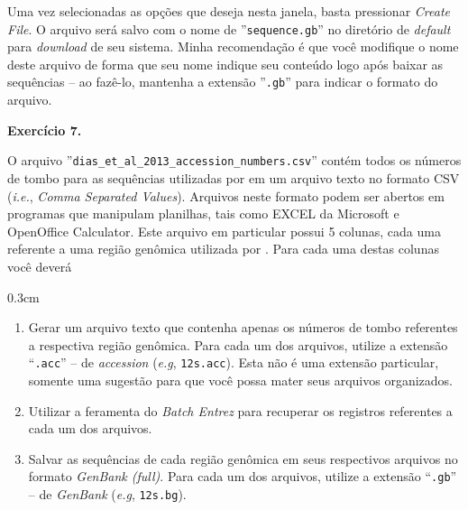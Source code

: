 \begin{refsection}

Uma vez selecionadas as opções que deseja nesta janela, basta pressionar \textit{Create File}. O arquivo será salvo com o nome de ''\texttt{sequence.gb}'' no diretório de \textit{default} para \textit{download} de seu sistema. Minha recomendação é que você modifique o nome deste arquivo de forma que seu nome indique seu conteúdo logo após baixar as sequências -- ao fazê-lo, mantenha a extensão ''\texttt{.gb}'' para indicar o formato do arquivo.\\


\begin{blackBlock}{\textbf{Exercício 7.}}\label{tut7:ex:ex1}

O arquivo ''\texttt{dias\_et\_al\_2013\_accession\_numbers.csv}'' contém todos os números de tombo para as sequências utilizadas por \textcite{dias_et_al_2013} em um arquivo texto no formato CSV (\textit{i.e.}, \textit{Comma Separated Values}). Arquivos neste formato podem ser abertos em programas que manipulam planilhas, tais como EXCEL da Microsoft e OpenOffice Calculator. Este arquivo em particular possui 5 colunas, cada uma referente a uma região genômica utilizada por \textcite{dias_et_al_2013}. Para cada uma destas colunas você deverá

\end{blackBlock}


\begin {myindentpar}{0.3cm}
\begin{enumerate}[\itshape i.]
	\item{Gerar um arquivo texto que contenha apenas os números de tombo referentes a respectiva região genômica. Para cada um dos arquivos, utilize a extensão ``\texttt{.acc}'' -- de \textit{accession} (\textit{e.g}, \texttt{12s.acc}). Esta não é uma extensão particular, somente uma sugestão para que você possa mater seus arquivos organizados.}
	\item{Utilizar a feramenta do \textit{Batch Entrez} para recuperar os registros referentes a cada um dos arquivos.}
	\item{Salvar as sequências de cada região genômica em seus respectivos arquivos no formato \textit{GenBank (full)}. Para cada um dos arquivos, utilize a extensão ``\texttt{.gb}'' -- de \textit{GenBank} (\textit{e.g}, \texttt{12s.bg}).}
\end{enumerate}
\end{myindentpar}


\end{refsection}
